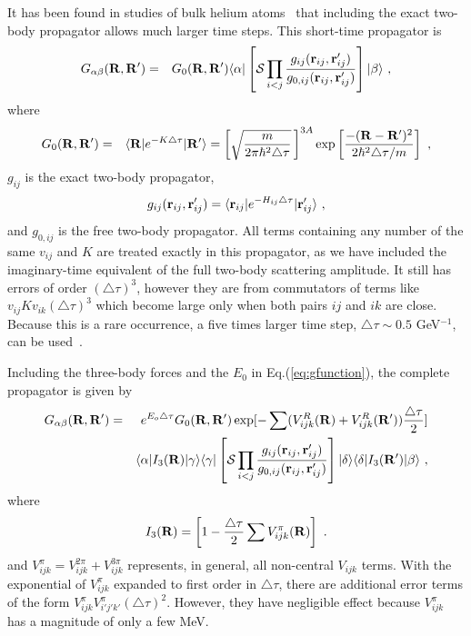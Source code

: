 It has been found in studies of bulk helium atoms~\cite{C95}
that including the exact two-body propagator allows much larger time steps.
This short-time propagator is
\begin{eqnarray}
G_{\alpha\beta}({\bf R},{\bf R}^{\prime}) &=& G_{0}({\bf R},{\bf
R}^{\prime})\langle\alpha|\left[{\cal S}\prod_{i<j}\frac{g_{ij}({\bf
r}_{ij},{\bf r}_{ij}^{\prime})}{g_{0,ij}({\bf r}_{ij},{\bf r}_{ij}^{\prime})}
\right] |\beta\rangle \ ,
\end{eqnarray}
where
\begin{eqnarray}
G_{0}({\bf R},{\bf R}^{\prime}) &=& \langle {\bf R}|e^{-{K}\triangle\tau}|{\bf
R}^{\prime}\rangle =  \left[ \sqrt{\frac{m}
{2\pi\hbar^{2} \triangle\tau}}\, \right]^{3A}\exp\left[\frac{-({\bf R}-{\bf
R}^{\prime})^2}{2\hbar^{2}\triangle\tau/m}\right] \ ,
\label{eq:propagator2}
\end{eqnarray}
$g_{ij}$ is the exact two-body propagator,
\begin{eqnarray}
g_{ij}({\bf r}_{ij},{\bf r}_{ij}^{\prime}) = \langle{\bf
r}_{ij}|e^{-H_{ij}\triangle\tau}|{\bf r}_{ij}^{\prime}\rangle \ ,
\label{eq:gij}
\end{eqnarray}
and $g_{0,ij}$ is the free two-body propagator.
All terms containing any number of the same $v_{ij}$ and $K$ are treated
exactly in this propagator, as we have included the imaginary-time equivalent
of the full two-body scattering amplitude.
It still has errors of order $(\triangle\tau)^{3}$, however they are from
commutators of terms like $v_{ij}Kv_{ik}(\triangle\tau)^{3}$ which become
large only when both pairs $ij$ and $ik$ are close.
Because this is a rare occurrence, a five times larger time step,
$\triangle\tau \sim 0.5$ GeV$^{-1}$, can be used~\cite{PPCPW97}.

Including the three-body forces and the $E_{0}$ in
Eq.(\ref{eq:gfunction}), the complete propagator is given by
\begin{eqnarray}
G_{\alpha\beta}({\bf R},{\bf R}^{\prime})& = &e^{E_{o}\triangle\tau}G_{0}({\bf
R},{\bf R}^{\prime})\exp[{- \sum (V^{R}_{ijk}({\bf R})+ V^{R}_{ijk}({\bf
R^{\prime}}))\frac{\triangle\tau}{2}}] \nonumber \\
& & \langle\alpha|I_{3}({\bf R})|\gamma\rangle\langle\gamma|\left[{\cal
S}\prod_{i<j}\frac{g_{ij}({\bf r}_{ij},{\bf r}_{ij}^{\prime})}
{g_{0,ij}({\bf r}_{ij},{\bf r}_{ij}^{\prime})} \right] 
|\delta\rangle\langle\delta|I_{3}({\bf
R}^{\prime})|\beta\rangle~,
\label{eq:fullprop}
\end{eqnarray}
where
\begin{eqnarray}
I_{3}({\bf R}) = \left[1 - \frac{\triangle\tau}{2}\sum V^{\pi}_{ijk}({\bf
R})\right]~.
\end{eqnarray}
and $V^{\pi}_{ijk}=V^{2\pi}_{ijk}+V^{3\pi}_{ijk}$ represents, in general,  all
non-central $V_{ijk}$ terms.
With the exponential of $V^{\pi}_{ijk}$ expanded to first order in
$\triangle\tau$, there are additional error terms of the form
$V^{\pi}_{ijk}V^{\pi}_{i'j'k'}(\triangle\tau)^{2}$.
However, they have negligible effect because $V^{\pi}_{ijk}$ has a magnitude
of only a few MeV.


